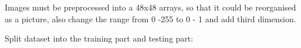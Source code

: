 Images must be preprocessed into a 48x48 arrays, so that it could be reorganised as a picture, also change the range from 0 -255 to 0 - 1
and add third dimension.

Split dataset into the training part and testing part:

~\cite{repo}